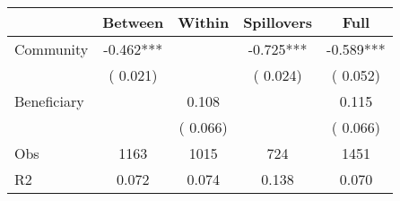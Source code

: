
\begin{tabular}{l*{4}{c}}\hline&\multicolumn{1}{c}{Between}&\multicolumn{1}{c}{Within}&\multicolumn{1}{c}{Spillovers}&\multicolumn{1}{c}{Full}\\ \hline
 Community             &             -0.462***      &                                               &       -0.725*** &        -0.589***                            \\ 
                               &        (       0.021)           &                                       &       (       0.024)     &      (       0.052)                                           \\ 
 Beneficiary   &                                               &        0.108    &                                &             0.115                            \\ 
                               &                                               & (       0.066)                  &                                        &      (       0.066)                                           \\ 
\hline                                                                                                                                                                                                                                            
 Obs                   &               1163               &       1015                       &       724                &              1451                                               \\ 
 R2                    &                      0.072              &              0.074                      &              0.138               &                     0.070                                              \\ 
\hline \end{tabular}                                                                                                                                                                                                              